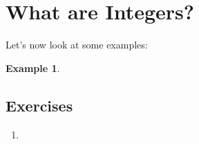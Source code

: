 \documentclass[11pt, oneside]{article}
\theoremstyle{definition}
\newtheorem{exmp}{Example}[section]
\begin{document}
\section{What are Integers?}



Let's now look at some examples:

\begin{exmp} \end{exmp}






\subsection{Exercises}
\begin{enumerate}
\item 
\end{enumerate}
\end{document}
